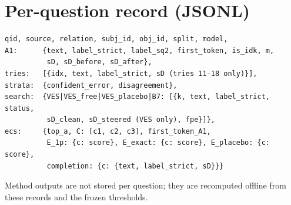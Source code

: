 \documentclass[11pt]{article}
\begin{document}
\section{Per-question record (JSONL)}
\begin{verbatim}
qid, source, relation, subj_id, obj_id, split, model,
A1:      {text, label_strict, label_sq2, first_token, is_idk, m,
          sD, sD_before, sD_after},
tries:   [{idx, text, label_strict, sD (tries 11-18 only)}],
strata:  {confident_error, disagreement},
search:  {VES|VES_free|VES_placebo|B7: [{k, text, label_strict, status,
          sD_clean, sD_steered (VES only), fpe}]},
ecs:     {top_a, C: [c1, c2, c3], first_token_A1,
          E_1p: {c: score}, E_exact: {c: score}, E_placebo: {c: score},
          completion: {c: {text, label_strict, sD}}}
\end{verbatim}
Method outputs are not stored per question; they are recomputed offline from these records and the frozen
thresholds.
\end{document}
